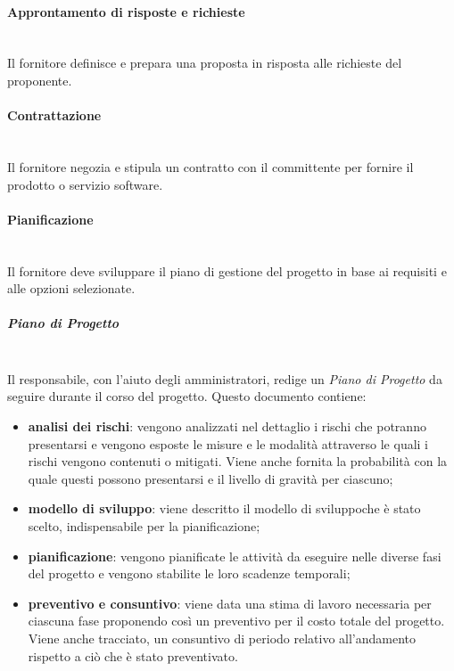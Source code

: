 		\paragraph{Approntamento di risposte e richieste} \mbox{}\\
		Il fornitore definisce e prepara una proposta in risposta alle richieste del 
		proponente.
		\paragraph{Contrattazione} \mbox{}\\
		Il fornitore negozia e stipula un contratto con il committente per fornire il 
		prodotto o servizio software.
		\paragraph{Pianificazione} \mbox{}\\
		Il fornitore deve sviluppare il piano di gestione del progetto in base ai 
		requisiti e alle opzioni selezionate.
			\subparagraph{Piano di Progetto} \mbox{}\\ 
			
			\noindent Il responsabile, con l'aiuto degli amministratori, redige un 
			\textit{Piano di 
				Progetto} da seguire durante il corso del progetto. Questo documento 
				contiene:
			\begin{itemize}
				\item \textbf{analisi dei rischi}: vengono analizzati nel dettaglio i 
				rischi 
				che potranno presentarsi e vengono esposte le misure e le modalità 
				attraverso le 
				quali i rischi vengono contenuti o mitigati. Viene anche fornita la 
				probabilità 
				con la quale questi possono presentarsi e il livello di gravità per 
				ciascuno;
				\item \textbf{modello di sviluppo\glo}: viene descritto il modello di 
				sviluppo\glosp che è stato scelto, indispensabile per la pianificazione;
				\item \textbf{pianificazione}: vengono pianificate le attività da eseguire 
				nelle diverse fasi del progetto e vengono stabilite le loro scadenze 
				temporali;
				\item \textbf{preventivo e consuntivo}: viene data una stima di lavoro 
				necessaria per ciascuna fase proponendo così un preventivo per il costo 
				totale 
				del progetto. Viene anche tracciato, un consuntivo di periodo relativo 
				all'andamento rispetto a ciò che è stato preventivato.
			\end{itemize}
			

